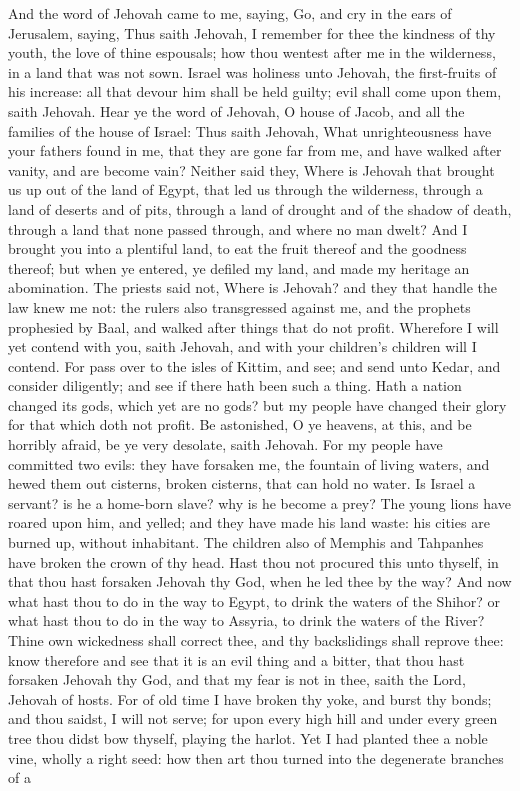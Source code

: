 And the word of Jehovah came to me, saying, Go, and cry in the ears of Jerusalem, saying, Thus saith Jehovah, I remember for thee the kindness of thy youth, the love of thine espousals; how thou wentest after me in the wilderness, in a land that was not sown. Israel was holiness unto Jehovah, the first-fruits of his increase: all that devour him shall be held guilty; evil shall come upon them, saith Jehovah.  Hear ye the word of Jehovah, O house of Jacob, and all the families of the house of Israel: Thus saith Jehovah, What unrighteousness have your fathers found in me, that they are gone far from me, and have walked after vanity, and are become vain? Neither said they, Where is Jehovah that brought us up out of the land of Egypt, that led us through the wilderness, through a land of deserts and of pits, through a land of drought and of the shadow of death, through a land that none passed through, and where no man dwelt? And I brought you into a plentiful land, to eat the fruit thereof and the goodness thereof; but when ye entered, ye defiled my land, and made my heritage an abomination. The priests said not, Where is Jehovah? and they that handle the law knew me not: the rulers also transgressed against me, and the prophets prophesied by Baal, and walked after things that do not profit.  Wherefore I will yet contend with you, saith Jehovah, and with your children’s children will I contend. For pass over to the isles of Kittim, and see; and send unto Kedar, and consider diligently; and see if there hath been such a thing. Hath a nation changed its gods, which yet are no gods? but my people have changed their glory for that which doth not profit. Be astonished, O ye heavens, at this, and be horribly afraid, be ye very desolate, saith Jehovah. For my people have committed two evils: they have forsaken me, the fountain of living waters, and hewed them out cisterns, broken cisterns, that can hold no water.  Is Israel a servant? is he a home-born slave? why is he become a prey? The young lions have roared upon him, and yelled; and they have made his land waste: his cities are burned up, without inhabitant. The children also of Memphis and Tahpanhes have broken the crown of thy head. Hast thou not procured this unto thyself, in that thou hast forsaken Jehovah thy God, when he led thee by the way? And now what hast thou to do in the way to Egypt, to drink the waters of the Shihor? or what hast thou to do in the way to Assyria, to drink the waters of the River? Thine own wickedness shall correct thee, and thy backslidings shall reprove thee: know therefore and see that it is an evil thing and a bitter, that thou hast forsaken Jehovah thy God, and that my fear is not in thee, saith the Lord, Jehovah of hosts.  For of old time I have broken thy yoke, and burst thy bonds; and thou saidst, I will not serve; for upon every high hill and under every green tree thou didst bow thyself, playing the harlot. Yet I had planted thee a noble vine, wholly a right seed: how then art thou turned into the degenerate branches of a 